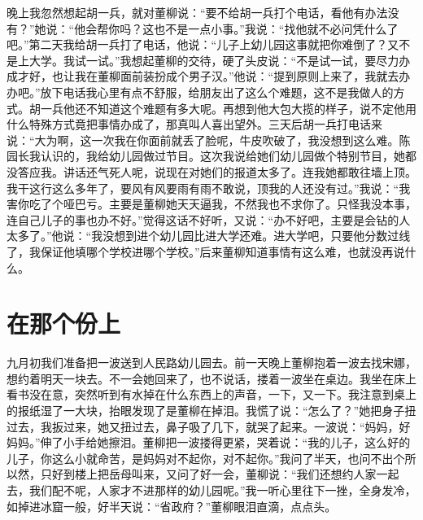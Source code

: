 \documentclass[12pt,oneside]{book}
\begin{document}
晚上我忽然想起胡一兵，就对董柳说：``要不给胡一兵打个电话，看他有办法没有？''她说：``他会帮你吗？这也不是一点小事。''我说：``找他就不必问凭什么了吧。''第二天我给胡一兵打了电话，他说：``儿子上幼儿园这事就把你难倒了？又不是上大学。我试一试。''我想起董柳的交待，硬了头皮说：``不是试一试，要尽力办成才好，也让我在董柳面前装扮成个男子汉。''他说：``提到原则上来了，我就去办办吧。''放下电话我心里有点不舒服，给朋友出了这么个难题，这不是我做人的方式。胡一兵他还不知道这个难题有多大呢。再想到他大包大揽的样子，说不定他用什么特殊方式竟把事情办成了，那真叫人喜出望外。三天后胡一兵打电话来说：``大为啊，这一次我在你面前就丢了脸呢，牛皮吹破了，我没想到这么难。陈园长我认识的，我给幼儿园做过节目。这次我说给她们幼儿园做个特别节目，她都没答应我。讲话还气死人呢，说现在对她们的报道太多了。连我她都敢往墙上顶。我干这行这么多年了，要风有风要雨有雨不敢说，顶我的人还没有过。''我说：``我害你吃了个哑巴亏。主要是董柳她天天逼我，不然我也不求你了。只怪我没本事，连自己儿子的事也办不好。''觉得这话不好听，又说：``办不好吧，主要是会钻的人太多了。''他说：``我没想到进个幼儿园比进大学还难。进大学吧，只要他分数过线了，我保证他填哪个学校进哪个学校。''后来董柳知道事情有这么难，也就没再说什么。


\chapter{在那个份上}

九月初我们准备把一波送到人民路幼儿园去。前一天晚上董柳抱着一波去找宋娜，想约着明天一块去。不一会她回来了，也不说话，搂着一波坐在桌边。我坐在床上看书没在意，突然听到有水掉在什么东西上的声音，一下，又一下。我注意到桌上的报纸湿了一大块，抬眼发现了是董柳在掉泪。我慌了说：``怎么了？''她把身子扭过去，我扳过来，她又扭过去，鼻子吸了几下，就哭了起来。一波说：``妈妈，好妈妈。''伸了小手给她擦泪。董柳把一波搂得更紧，哭着说：``我的儿子，这么好的儿子，你这么小就命苦，是妈妈对不起你，对不起你。''我问了半天，也问不出个所以然，只好到楼上把岳母叫来，又问了好一会，董柳说：``我们还想约人家一起去，我们配不呢，人家才不进那样的幼儿园呢。''我一听心里往下一挫，全身发冷，如掉进冰窟一般，好半天说：``省政府？''董柳眼泪直滴，点点头。
\end{document}
